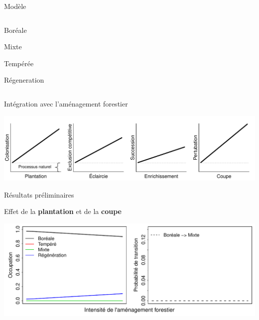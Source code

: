 \documentclass[11pt, compress, aspectratio=1610]{beamer}
\providecommand{\tightlist}{%
  \setlength{\itemsep}{0pt}\setlength{\parskip}{0pt}}
\newcommand{\begincols}{\begin{columns}}
\newcommand{\stopcols}{\end{columns}}
\begin{document}
\begin{frame}{Modèle}

\begincols
{} 
\hfill{}

\begin{description}
\tightlist
\item[B]
Boréale
\item[M]
Mixte
\item[T]
Tempérée
\item[R]
Régeneration
\end{description}

\stopcols

\end{frame}

\begin{frame}{Intégration avec l'aménagement forestier}

\centering
 \includegraphics[scale=0.65]{figures/managMechanism.pdf}\par

\end{frame}

\begin{frame}{Résultats préliminaires}

Effet de la \textbf{plantation} et de la \textbf{coupe}

\centering
 \includegraphics[scale=0.65]{figures/result0.pdf}\par

\end{frame}
\end{document}
